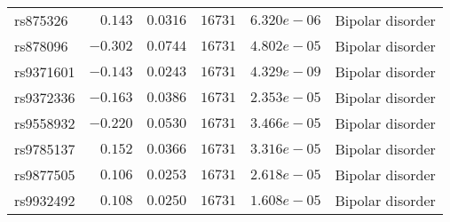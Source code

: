 \begin{tabular}{lrrrrl}
rs875326&$ 0.143$&$0.0316$&$ 16731$&$6.320e-06$&Bipolar disorder\tabularnewline
rs878096&$-0.302$&$0.0744$&$ 16731$&$4.802e-05$&Bipolar disorder\tabularnewline
rs9371601&$-0.143$&$0.0243$&$ 16731$&$4.329e-09$&Bipolar disorder\tabularnewline
rs9372336&$-0.163$&$0.0386$&$ 16731$&$2.353e-05$&Bipolar disorder\tabularnewline
rs9558932&$-0.220$&$0.0530$&$ 16731$&$3.466e-05$&Bipolar disorder\tabularnewline
rs9785137&$ 0.152$&$0.0366$&$ 16731$&$3.316e-05$&Bipolar disorder\tabularnewline
rs9877505&$ 0.106$&$0.0253$&$ 16731$&$2.618e-05$&Bipolar disorder\tabularnewline
rs9932492&$ 0.108$&$0.0250$&$ 16731$&$1.608e-05$&Bipolar disorder\tabularnewline
\hline
\end{tabular}
